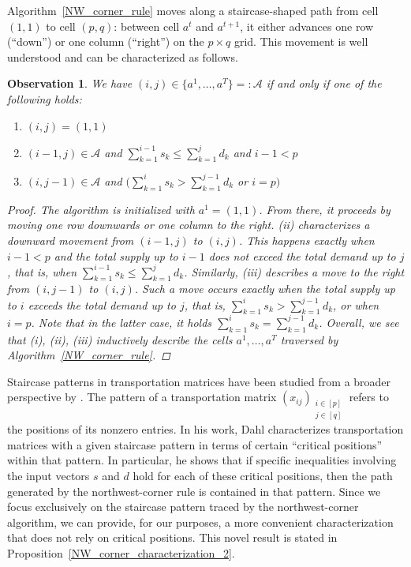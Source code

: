 \documentclass[letterpaper]{article}
\newtheorem{observation}[theorem]{Observation}
\begin{document}
Algorithm~\ref{NW_corner_rule} moves along a staircase-shaped path from cell $(1,1)$ to cell $(p,q)$: between cell $a^t$ and $a^{t+1}$, it either advances one row (\enquote{down}) or one column (\enquote{right}) on the $p \times q$ grid. This movement is well understood and can be characterized as follows.
\begin{observation}\label{NW_corner_characterization}
    We have $(i, j) \in \{ a^1, \dots, a^T \} =: \mathcal{A}$ if and only if one of the following holds:
    \begin{enumerate}
        \item[(i)] $(i, j) = (1, 1)$
        \item[(ii)] $(i-1, j) \in \mathcal{A}$ and $\sum_{k=1}^{i-1} s_k \leq \sum_{k=1}^{j} d_k$ and $i-1 < p$
        \item[(iii)] $(i, j-1) \in \mathcal{A}$ and $\bigl(\sum_{k=1}^{i} s_k > \sum_{k=1}^{j-1} d_k$ or $i = p \bigr)$
    \end{enumerate}
    \begin{proof}
        The algorithm is initialized with $a^1 = (1, 1)$. From there, it proceeds by moving one row downwards or one column to the right. \textit{(ii)} characterizes a downward movement from $(i-1, j)$ to $(i, j)$. This happens exactly when $i - 1 < p$ and the total supply up to $i-1$ does not exceed the total demand up to $j$, that is, when $\sum_{k=1}^{i-1} s_k \leq \sum_{k=1}^{j} d_k$. Similarly, \textit{(iii)} describes a move to the right from $(i, j-1)$ to $(i, j)$. Such a move occurs exactly when the total supply up to $i$ exceeds the total demand up to $j$, that is, $\sum_{k=1}^{i} s_k > \sum_{k=1}^{j-1} d_k$, or when $i = p$. Note that in the latter case, it holds $\sum_{k=1}^{i} s_k = \sum_{k=1}^{j-1} d_k$. Overall, we see that \textit{(i), (ii), (iii)} inductively describe the cells $a^1, \dots, a^T$ traversed by Algorithm~\ref{NW_corner_rule}.
    \end{proof}
\end{observation}

Staircase patterns in transportation matrices have been studied from a broader perspective by \citet{dahl_transportation_2008}. The pattern of a transportation matrix $(x_{ij})_{\substack{i \in [p] \\ j \in [q]}}$ refers to the positions of its nonzero entries. In his work, Dahl characterizes transportation matrices with a given staircase pattern in terms of certain \enquote{critical positions} within that pattern. In particular, he shows that if specific inequalities involving the input vectors $s$ and $d$ hold for each of these critical positions, then the path generated by the northwest-corner rule is contained in that pattern. Since we focus exclusively on the staircase pattern traced by the northwest-corner algorithm, we can provide, for our purposes, a more convenient characterization that does not rely on critical positions. This novel result is stated in Proposition~\ref{NW_corner_characterization_2}.
\end{document}

